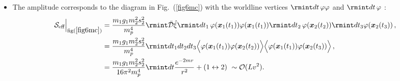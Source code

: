 \begin{itemize}
\begin{align}
\begin{split}
        =\frac{m_1 s_1 m_2^2s_2}{2 m_p^4}\rmint dt \rmint_{k_1}\frac{e^{i\boldsymbol{k}_1\cdot\boldsymbol{r}}}{\boldsymbol{k}_1^2+m^2}\rmint_{k_2}\frac{e^{i\boldsymbol{k}_2\cdot\boldsymbol{r}}}{\boldsymbol{k}_2^2}\,,\\ &
        =\frac{m_1 s_1 m_2^2s_2}{32 \pi^2 m_p^4}\rmint dt \frac{e^{-mr}}{r^2}+(1\leftrightarrow 2)\,\,\sim \mathcal{O}(Lv^2).
    \end{split}
\end{align}
\item The amplitude corresponds to the diagram in Fig.~(\ref{fig6mc}) with the worldline vertices $\rmint dt\, \varphi\varphi$ and $\rmint dt \,\varphi$ : 
\begin{align}
    \begin{split}
\mathcal{S}_{\text{eff}}\Big |_{\text{fig}(\ref{fig6mc})}&=\frac{m_1g_1m_2^2s_2^2}{m_{p}^4}\rmint\Bar{\mathcal{D}}\Hat{\xi}\rmint dt_1 \,\varphi(\boldsymbol{x}_1(t_1))\varphi(\boldsymbol{x}_1(t_1)) \rmint dt_2 \,\varphi(\boldsymbol{x}_2(t_2))\rmint dt_3 \varphi(\boldsymbol{x}_2(t_3)) \,,\\ & =\frac{m_1 g_1 m_2^2 s_2^2}{m_p^4}\rmint dt_1 dt_2 dt_3 \Big\langle\varphi(\boldsymbol{x}_1(t_1))\varphi(\boldsymbol{x}_2(t_2))\Big\rangle \Big\langle\varphi(\boldsymbol{x}_1(t_1))\varphi(\boldsymbol{x}_2(t_3))\Big\rangle\,,\\ &
         =\frac{m_1 g_1 m_2^2 s_2^2}{16\pi^2 m_p^4}\rmint dt \frac{e^{-2mr}}{r^2}+(1\leftrightarrow 2)\,\,\sim \mathcal{O}(Lv^2).
    \end{split}
\end{align}
\end{itemize}
